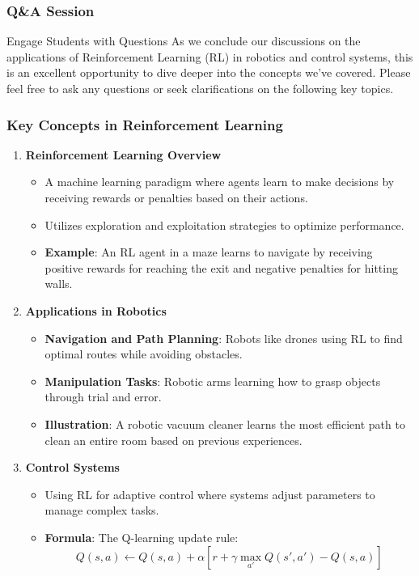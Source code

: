 \documentclass[aspectratio=169]{beamer}
\begin{document}
\begin{frame}[fragile]
  \frametitle{Q\&A Session}
  \begin{block}{Engage Students with Questions}
    As we conclude our discussions on the applications of Reinforcement Learning (RL) in robotics and control systems, this is an excellent opportunity to dive deeper into the concepts we've covered. 
    Please feel free to ask any questions or seek clarifications on the following key topics.
  \end{block}
\end{frame}

\begin{frame}[fragile]
  \frametitle{Key Concepts in Reinforcement Learning}
  \begin{enumerate}
    \item \textbf{Reinforcement Learning Overview}
    \begin{itemize}
      \item A machine learning paradigm where agents learn to make decisions by receiving rewards or penalties based on their actions.
      \item Utilizes exploration and exploitation strategies to optimize performance.
      \item \textbf{Example}: An RL agent in a maze learns to navigate by receiving positive rewards for reaching the exit and negative penalties for hitting walls.
    \end{itemize}
    
    \item \textbf{Applications in Robotics}
    \begin{itemize}
      \item \textbf{Navigation and Path Planning}: Robots like drones using RL to find optimal routes while avoiding obstacles.
      \item \textbf{Manipulation Tasks}: Robotic arms learning how to grasp objects through trial and error.
      \item \textbf{Illustration}: A robotic vacuum cleaner learns the most efficient path to clean an entire room based on previous experiences.
    \end{itemize}

    \item \textbf{Control Systems}
    \begin{itemize}
      \item Using RL for adaptive control where systems adjust parameters to manage complex tasks.
      \item \textbf{Formula}: The Q-learning update rule:
      \begin{equation}
        Q(s, a) \leftarrow Q(s, a) + \alpha [ r + \gamma \max_{a'} Q(s', a') - Q(s, a)]
      \end{equation}
      \end{itemize}
  \end{enumerate}
\end{frame}
\end{document}
